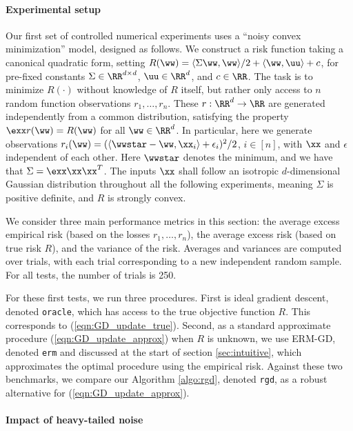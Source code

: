 \documentclass[11pt,oneside]{article}
\theoremstyle{definition} \newtheorem{defn}{Definition}       %
\theoremstyle{plain} \newtheorem{prop}[defn]{Proposition}           %
\theoremstyle{plain} \newtheorem{thm}[defn]{Theorem}                %
\theoremstyle{plain} \newtheorem{lem}[defn]{Lemma}                  %
\theoremstyle{plain} \newtheorem{cor}[defn]{Corollary}              %
\theoremstyle{remark} \newtheorem{rmk}[defn]{Remark}                %
\theoremstyle{remark} \newtheorem{ex}[defn]{Example}                %
\begin{document}
\paragraph{Experimental setup}


Our first set of controlled numerical experiments uses a ``noisy convex minimization'' model, designed as follows. We construct a risk function taking a canonical quadratic form, setting $R(\ww) = \langle \Sigma\ww, \ww \rangle/2 + \langle \ww, \uu \rangle + c$, for pre-fixed constants $\Sigma \in \RR^{d \times d}$, $\uu \in \RR^{d}$, and $c \in \RR$. The task is to minimize $R(\cdot)$ without knowledge of $R$ itself, but rather only access to $n$ random function observations $r_{1},\ldots,r_{n}$. These $r:\RR^{d} \to \RR$ are generated independently from a common distribution, satisfying the property $\exx r(\ww) = R(\ww)$ for all $\ww \in \RR^{d}$. In particular, here we generate observations $r_{i}(\ww)=(\langle \wwstar-\ww, \xx_{i}\rangle + \epsilon_{i})^{2}/2$, $i \in [n]$, with $\xx$ and $\epsilon$ independent of each other. Here $\wwstar$ denotes the minimum, and we have that $\Sigma = \exx \xx\xx^{T}$. The inputs $\xx$ shall follow an isotropic $d$-dimensional Gaussian distribution throughout all the following experiments, meaning $\Sigma$ is positive definite, and $R$ is strongly convex.


We consider three main performance metrics in this section: the average excess empirical risk (based on the losses $r_{1},\ldots,r_{n}$), the average excess risk (based on true risk $R$), and the variance of the risk. Averages and variances are computed over trials, with each trial corresponding to a new independent random sample. For all tests, the number of trials is 250.


For these first tests, we run three procedures. First is ideal gradient descent, denoted \texttt{oracle}, which has access to the true objective function $R$. This corresponds to (\ref{eqn:GD_update_true}). Second, as a standard approximate procedure (\ref{eqn:GD_update_approx}) when $R$ is unknown, we use ERM-GD, denoted \texttt{erm} and discussed at the start of section \ref{sec:intuitive}, which approximates the optimal procedure using the empirical risk. Against these two benchmarks, we compare our Algorithm \ref{algo:rgd}, denoted \texttt{rgd}, as a robust alternative for (\ref{eqn:GD_update_approx}).


\paragraph{Impact of heavy-tailed noise}
\end{document}
